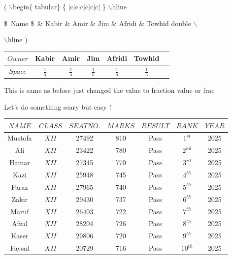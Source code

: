 \documentclass[11pt]{article}
\begin{document}
( $\backslash$begin\{ tabular\} \{ $|$c$|$c$|$c$|$c$|$c$|$c$|$ \} $\backslash$hline 

\$\ Name \$\ \& Kabir \& Amir \& Jim \& Afridi \& Towhid double $\backslash$

 $\backslash$hline )



\vspace{1cm}

\begin{tabular}{|c||c|c|c|c|c|c|}
\hline

$Owner$ & Kabir & Amir & Jim & Afridi & Towhid \\ \hline
$Space$ & $\frac{1}{5}$ & $\frac{1}{5}$ & $\frac{1}{5}$ & $\frac{1}{5}$ & $\frac{1}{5}$ \\ \hline

\end{tabular}

\vspace{1cm}


This is same as before just changed the value to fraction value or frac

Let's do something scary but easy !



\vspace{1cm}

\begin{tabular}{|c|c|c|c|c|c|c|}
\hline
$NAME$ & $CLASS$ & $SEAT NO.$ & $MARKS$ & $RESULT$ & $RANK$ & $YEAR$ \\ \hline
Mustofa & $XII$ &  27492 & 810 & Pass & $1^{st}$ & 2025 \\ \hline
Ali & $XII$ &  23422 & 780 & Pass & $2^{nd}$ & 2025 \\ \hline
Hamar & $XII$ &  27345 & 770 & Pass & $3^{rd}$ & 2025 \\ \hline
Kazi & $XII$ &  25948 & 745 & Pass & $4^{th}$ & 2025 \\ \hline
Faraz & $XII$ &  27965 & 740 & Pass & $5^{th}$ & 2025 \\ \hline
Zakir & $XII$ &  29430 & 737 & Pass & $6^{th}$ & 2025 \\ \hline
Maruf & $XII$ &  26403 & 722 & Pass & $7^{th}$ & 2025 \\ \hline
Afzal & $XII$ &  28204 & 726 & Pass & $8^{th}$ & 2025 \\ \hline
Kaser & $XII$ &  29806 & 720 & Pass & $9^{th}$ & 2025 \\ \hline
Faysal & $XII$ &  20729 & 716 & Pass & $10^{th}$ & 2025 \\ \hline



\end{tabular}
\end{document}
